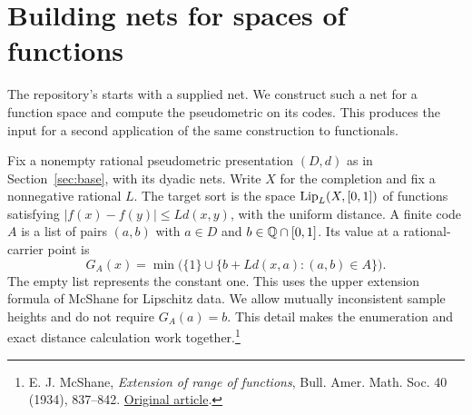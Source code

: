 \section{Building nets for spaces of functions}
\label{sec:lipsort}

The repository's  starts with a supplied net. We construct such a net for a function space and compute the pseudometric on its codes. This produces the input for a second application of the same construction to functionals.

Fix a nonempty rational pseudometric presentation $(D,d)$ as in Section~\ref{sec:base}, with its dyadic nets. Write $X$ for the completion and fix a nonnegative rational $L$. The target sort is the space $\operatorname{Lip}_L(X,[0,1])$ of functions satisfying $|f(x)-f(y)|\le Ld(x,y)$, with the uniform distance. A finite code $A$ is a list of pairs $(a,b)$ with $a\in D$ and $b\in\mathbb Q\cap[0,1]$. Its value at a rational-carrier point is
\begin{equation}
 G_A(x)=\min\bigl(\{1\}\cup\{b+Ld(x,a):(a,b)\in A\}\bigr).
 \label{eq:cone}
\end{equation}
The empty list represents the constant one. This uses the upper extension formula of McShane for Lipschitz data. We allow mutually inconsistent sample heights and do not require $G_A(a)=b$. This detail makes the enumeration and exact distance calculation work together.\footnote{E. J. McShane, \emph{Extension of range of functions}, Bull. Amer. Math. Soc. 40 (1934), 837--842. \href{https://doi.org/10.1090/S0002-9904-1934-05978-0}{Original article}.}

